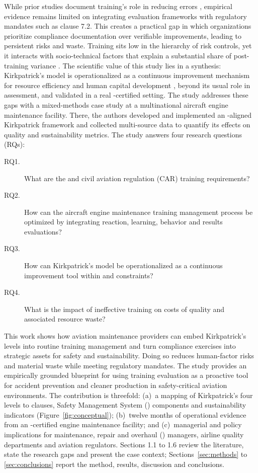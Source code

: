 While prior studies document training's role in reducing errors \parencite{EASA2025}, empirical evidence remains limited on integrating evaluation frameworks with regulatory mandates such as \AS{} clause 7.2.  This creates a practical gap in which organizations prioritize compliance documentation over verifiable improvements, leading to persistent risks and waste. Training sits low in the hierarchy of risk controls, yet it interacts with socio-technical factors that explain a substantial share of post-training variance \parencite{OConnor2024}. The scientific value of this study lies in a synthesis: Kirkpatrick's model is operationalized as a continuous improvement mechanism for resource efficiency and human capital development \parencite{Sousa2025}, beyond its usual role in assessment, and validated in a real \AS{}-certified setting. The study addresses these gaps with a mixed-methods case study at a multinational aircraft engine maintenance facility. There, the authors developed and implemented an \AS{}-aligned Kirkpatrick framework and collected multi-source data to quantify its effects on quality and sustainability metrics. The study answers four research questions (RQs):

\begin{description}
  \item[RQ1.] What are the \AS{} and civil aviation regulation (CAR) training requirements?
  \item[RQ2.] How can the aircraft engine maintenance training management process be optimized by integrating reaction, learning, behavior and results evaluations?
  \item[RQ3.] How can Kirkpatrick's model be operationalized as a continuous improvement tool within \AS{} and \CAA{} constraints?
  \item[RQ4.] What is the impact of ineffective training on costs of quality and associated resource waste?
\end{description}

This work shows how aviation maintenance providers can embed Kirkpatrick's levels into routine training management and turn compliance exercises into strategic assets for safety and sustainability. Doing so reduces human-factor risks and material waste while meeting regulatory mandates. The study provides an empirically grounded blueprint for using training evaluation as a proactive tool for accident prevention and cleaner production in safety-critical aviation environments. The contribution is threefold: (a)~a mapping of Kirkpatrick's four levels to \AS{} clauses, Safety Management System (\SMS{}) components and sustainability indicators (Figure~\ref{fig:conceptual}); (b)~twelve months of operational evidence from an \AS{}-certified engine maintenance facility; and (c)~managerial and policy implications for maintenance, repair and overhaul (\MRO{}) managers, airline quality departments and aviation regulators. Sections 1.1 to 1.6 review the literature, state the research gaps and present the case context; Sections~\ref{sec:methods} to \ref{sec:conclusions} report the method, results, discussion and conclusions.

